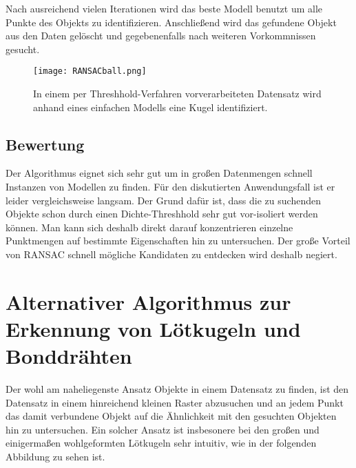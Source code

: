 Nach ausreichend vielen Iterationen wird das beste Modell benutzt um alle Punkte des Objekts zu identifizieren. Anschließend wird das gefundene Objekt aus den Daten gelöscht und gegebenenfalls nach weiteren Vorkommnissen gesucht.

\begin{figure}[H]
  \begin{center}
    \texttt{[image: RANSACball.png]}
    \caption{In einem per Threshhold-Verfahren vorverarbeiteten Datensatz wird anhand eines einfachen Modells eine Kugel identifiziert.}
    \label{fig:ransac2}
  \end{center}
\end{figure}

\subsection{Bewertung}
Der Algorithmus eignet sich sehr gut um in großen Datenmengen schnell Instanzen von Modellen zu finden. Für den diskutierten Anwendungsfall ist er leider vergleichsweise langsam. Der Grund dafür ist, dass die zu suchenden Objekte schon durch einen Dichte-Threshhold sehr gut vor-isoliert werden können. Man kann sich deshalb direkt darauf konzentrieren einzelne Punktmengen auf bestimmte Eigenschaften hin zu untersuchen. Der große Vorteil von RANSAC schnell mögliche Kandidaten zu entdecken wird deshalb negiert.

\section{Alternativer Algorithmus zur Erkennung von Lötkugeln und Bonddrähten}
Der wohl am naheliegenste Ansatz Objekte in einem Datensatz zu finden, ist den Datensatz in einem hinreichend kleinen Raster abzusuchen und an jedem Punkt das damit verbundene Objekt auf die Ähnlichkeit mit den gesuchten Objekten hin zu untersuchen.
Ein solcher Ansatz ist insbesonere bei den großen und einigermaßen wohlgeformten Lötkugeln sehr intuitiv, wie in der folgenden Abbildung zu sehen ist.


